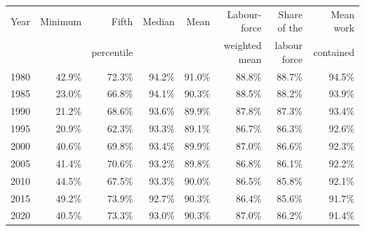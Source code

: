 \begin{tabular}{lrrrrrrr}
\hline\hline
Year & Minimum & Fifth & Median & Mean & Labour-force & Share of the & Mean work \\& & percentile & & & weighted mean & labour force & contained \\
\hline
1980 & 42.9\% & 72.3\% & 94.2\% & 91.0\% & 88.8\% & 88.7\% & 94.5\% \\
1985 & 23.0\% & 66.8\% & 94.1\% & 90.3\% & 88.5\% & 88.2\% & 93.9\% \\
1990 & 21.2\% & 68.6\% & 93.6\% & 89.9\% & 87.8\% & 87.3\% & 93.4\% \\
1995 & 20.9\% & 62.3\% & 93.3\% & 89.1\% & 86.7\% & 86.3\% & 92.6\% \\
2000 & 40.6\% & 69.8\% & 93.4\% & 89.9\% & 87.0\% & 86.6\% & 92.3\% \\
2005 & 41.4\% & 70.6\% & 93.2\% & 89.8\% & 86.8\% & 86.1\% & 92.2\% \\
2010 & 44.5\% & 67.5\% & 93.3\% & 90.0\% & 86.5\% & 85.8\% & 92.1\% \\
2015 & 49.2\% & 73.9\% & 92.7\% & 90.3\% & 86.4\% & 85.6\% & 91.7\% \\
2020 & 40.5\% & 73.3\% & 93.0\% & 90.3\% & 87.0\% & 86.2\% & 91.4\% \\
\hline\hline
\end{tabular}
